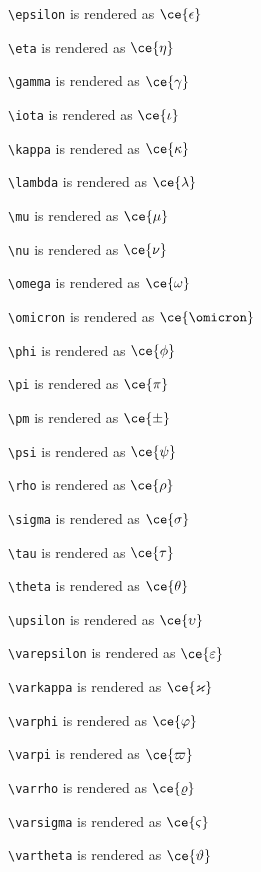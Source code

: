\texttt{\textbackslash epsilon} is rendered as $\ce{\epsilon}$

\texttt{\textbackslash eta} is rendered as $\ce{\eta}$

\texttt{\textbackslash gamma} is rendered as $\ce{\gamma}$

\texttt{\textbackslash iota} is rendered as $\ce{\iota}$

\texttt{\textbackslash kappa} is rendered as $\ce{\kappa}$

\texttt{\textbackslash lambda} is rendered as $\ce{\lambda}$

\texttt{\textbackslash mu} is rendered as $\ce{\mu}$

\texttt{\textbackslash nu} is rendered as $\ce{\nu}$

\texttt{\textbackslash omega} is rendered as $\ce{\omega}$

\texttt{\textbackslash omicron} is rendered as $\ce{\omicron}$

\texttt{\textbackslash phi} is rendered as $\ce{\phi}$

\texttt{\textbackslash pi} is rendered as $\ce{\pi}$

\texttt{\textbackslash pm} is rendered as $\ce{\pm}$

\texttt{\textbackslash psi} is rendered as $\ce{\psi}$

\texttt{\textbackslash rho} is rendered as $\ce{\rho}$

\texttt{\textbackslash sigma} is rendered as $\ce{\sigma}$

\texttt{\textbackslash tau} is rendered as $\ce{\tau}$

\texttt{\textbackslash theta} is rendered as $\ce{\theta}$

\texttt{\textbackslash upsilon} is rendered as $\ce{\upsilon}$

\texttt{\textbackslash varepsilon} is rendered as $\ce{\varepsilon}$

\texttt{\textbackslash varkappa} is rendered as $\ce{\varkappa}$

\texttt{\textbackslash varphi} is rendered as $\ce{\varphi}$

\texttt{\textbackslash varpi} is rendered as $\ce{\varpi}$

\texttt{\textbackslash varrho} is rendered as $\ce{\varrho}$

\texttt{\textbackslash varsigma} is rendered as $\ce{\varsigma}$

\texttt{\textbackslash vartheta} is rendered as $\ce{\vartheta}$

